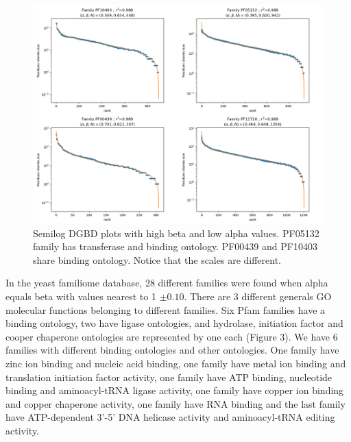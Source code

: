 \documentclass[preprint,12pt]{elsarticle}
\begin{document}
\begin{figure} %
    \centering
    \includegraphics[width=13cm]{images/02_mejoresBeta.png}
    \bigbreak
    \caption {Semilog DGBD plots with high beta and low alpha values. 
    PF05132 family has transferase and binding ontology. PF00439 and 
    PF10403 share binding ontology. Notice that the scales are different.}
    \label{fig:beta}
\end{figure}
\clearpage

In the yeast familiome database, 28 different families were 
found when alpha equals beta with values nearest to 1 $\pm0.10$. 
There are 3 different generals GO molecular functions belonging 
to different families. Six Pfam families have a 
binding ontology, two have ligase ontologies, and hydrolase, 
initiation factor and cooper chaperone ontologies are represented 
by one each (Figure 3). 
We have 6 families with different binding ontologies and other 
ontologies. 
One family have zinc ion binding and nucleic acid binding, one family 
have metal ion binding and translation initiation factor activity, one 
family have ATP binding, nucleotide binding and aminoacyl-tRNA ligase 
activity, one family have copper ion binding and copper chaperone activity, 
one family have RNA binding and the last family have ATP-dependent 3'-5' 
DNA helicase activity and aminoacyl-tRNA editing activity.  \par 
\end{document}
